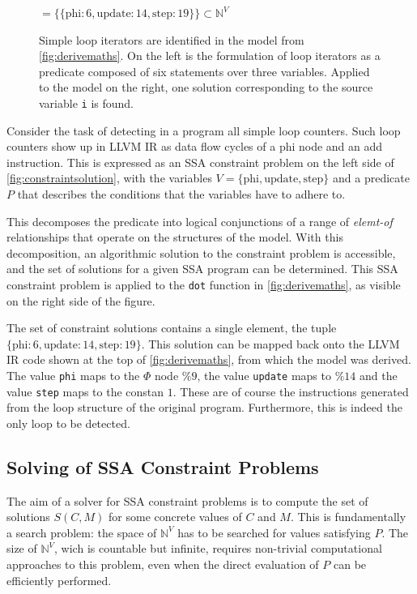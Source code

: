 \begin{figure}[t]
\vspace{0.5em}
{\huge$=\{\{\text{phi}:6,\text{update}:14,\text{step}:19\}\}\subset\mathbb N^V$}

\caption{Simple loop iterators are identified in the model from
         \autoref{fig:derivemaths}.
         On the left is the formulation of loop iterators as a predicate
         composed of six statements over three variables.
         Applied to the model on the right, one solution corresponding to
         the source variable {\tt i} is found.}
\label{fig:constraintsolution}
\end{figure}

    Consider the task of detecting in a program all simple loop counters.
    Such loop counters show up in LLVM IR as data flow cycles of a phi node
    and an add instruction.
    This is expressed as an SSA constraint problem on the left side of
    \autoref{fig:constraintsolution}, with the variables
    $V=\{\text{phi}, \text{update}, \text{step}\}$ and a predicate $P$ that
    describes the conditions that the variables have to adhere to.

    This decomposes the predicate into logical conjunctions of a range of
    {\em elemt-of} relationships that operate on the structures of the model.
    With this decomposition, an algorithmic solution to the constraint problem
    is accessible, and the set of solutions for a given SSA program can be
    determined.
    This SSA constraint problem is applied to the {\tt dot} function in
    \autoref{fig:derivemaths}, as visible on the right side of the figure.

    The set of constraint solutions contains a single element, the tuple
    $\{\text{phi}:6,\text{update}:14,\text{step}:19\}$.
    This solution can be mapped back onto the LLVM IR code shown at the top of
    \autoref{fig:derivemaths}, from which the model was derived.
    The value {\tt phi} maps to the $\Phi$ node $\%9$, the value {\tt update}
    maps to $\%14$ and the value {\tt step} maps to the constan $1$.
    These are of course the instructions generated from the loop structure of
    the original program.
    Furthermore, this is indeed the only loop to be detected.

\subsection{Solving of SSA Constraint Problems}

    The aim of a solver for SSA constraint problems is to compute the set of
    solutions $S(C,M)$ for some concrete values of $C$ and $M$.
    This is fundamentally a search problem: the space of $\mathbb N^V$ has to be
    searched for values satisfying $P$.
    The size of $\mathbb N^V$, wich is countable but infinite, requires
    non-trivial computational approaches to this problem, even when the direct
    evaluation of $P$ can be efficiently performed.

